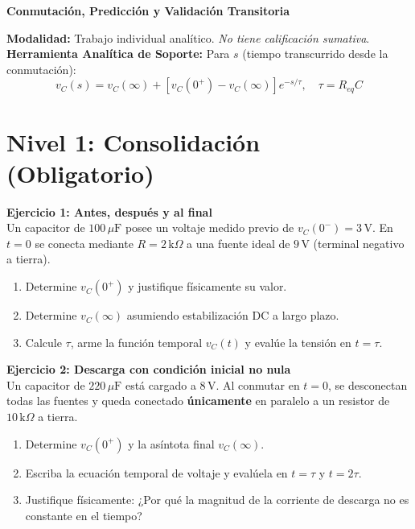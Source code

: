 \documentclass[11pt, a4paper]{article}
\begin{document}
\begin{tcolorbox}[colback=ucbblue!5!white, colframe=ucbblue, title=\textbf{Ejercicios de Consolidación Formativa: Circuitos RC de Primer Orden}]
    \centering \textbf{Conmutación, Predicción y Validación Transitoria}
\end{tcolorbox}

\noindent\textbf{Modalidad:} Trabajo individual analítico. \textit{No tiene calificación sumativa}. \\
\textbf{Herramienta Analítica de Soporte:} Para $s$ (tiempo transcurrido desde la conmutación):
\begin{equation*}
    v_C(s) = v_C(\infty) + \left[ v_C(0^+) - v_C(\infty) \right]e^{-s/\tau}, \quad \tau = R_{eq} C
\end{equation*}

\vspace{0.3cm}
\section*{Nivel 1: Consolidación (Obligatorio)}

\textbf{Ejercicio 1: Antes, después y al final}\\
Un capacitor de $100\,\mu\text{F}$ posee un voltaje medido previo de $v_C(0^-) = 3\,\text{V}$. En $t=0$ se conecta mediante $R = 2\,\text{k}\Omega$ a una fuente ideal de $9\,\text{V}$ (terminal negativo a tierra).
\begin{enumerate}
    \item Determine $v_C(0^+)$ y justifique físicamente su valor.
    \item Determine $v_C(\infty)$ asumiendo estabilización DC a largo plazo.
    \item Calcule $\tau$, arme la función temporal $v_C(t)$ y evalúe la tensión en $t = \tau$.
\end{enumerate}

\vspace{0.2cm}
\textbf{Ejercicio 2: Descarga con condición inicial no nula}\\
Un capacitor de $220\,\mu\text{F}$ está cargado a $8\,\text{V}$. Al conmutar en $t=0$, se desconectan todas las fuentes y queda conectado \textbf{únicamente} en paralelo a un resistor de $10\,\text{k}\Omega$ a tierra.
\begin{enumerate}
    \item Determine $v_C(0^+)$ y la asíntota final $v_C(\infty)$.
    \item Escriba la ecuación temporal de voltaje y evalúela en $t = \tau$ y $t = 2\tau$.
    \item Justifique físicamente: ¿Por qué la magnitud de la corriente de descarga no es constante en el tiempo?
\end{enumerate}
\end{document}
